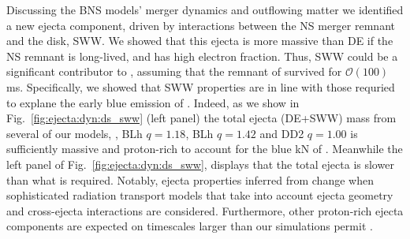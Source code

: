 
Discussing the \ac{BNS} models' merger dynamics and outflowing matter we 
identified a new ejecta component, driven by interactions between the \ac{NS} 
merger remnant and the disk, \ac{SWW}. %
%
We showed that this ejecta is more massive than \ac{DE} if the \ac{NS} remnant 
is long-lived, and has high electron fraction. %
%
Thus, \ac{SWW} could be a significant contributor to \AT{}, assuming that 
the \pmerg{} remnant of \GW{} survived for $\mathcal{O}(100)\,$ms.
Specifically, we showed that \ac{SWW} properties are in line with 
those requried to explane the early blue emission of \AT{}. 
%
Indeed, as we show in Fig.~\ref{fig:ejecta:dyn:ds_sww} (left panel)
%
the total ejecta (\ac{DE}+\ac{SWW}) mass from several of our models, \eg, 
BLh $q=1.18$, BLh $q=1.42$ and DD2 $q=1.00$ 
is sufficiently massive and proton-rich to account for the blue 
\ac{kN} of \AT{}. Meanwhile the left panel of Fig.~\ref{fig:ejecta:dyn:ds_sww}, 
displays that the total ejecta is slower than what is required. 
%
Notably, ejecta properties inferred from \AT{} change when sophisticated 
radiation transport models that take into account ejecta geometry and cross-ejecta 
interactions are considered. Furthermore, other proton-rich ejecta components are 
expected on timescales larger than our simulations permit 
\citep[\eg][]{Fujibayashi:2017puw,Fernandez:2018kax,Radice:2018xqa}.

%



